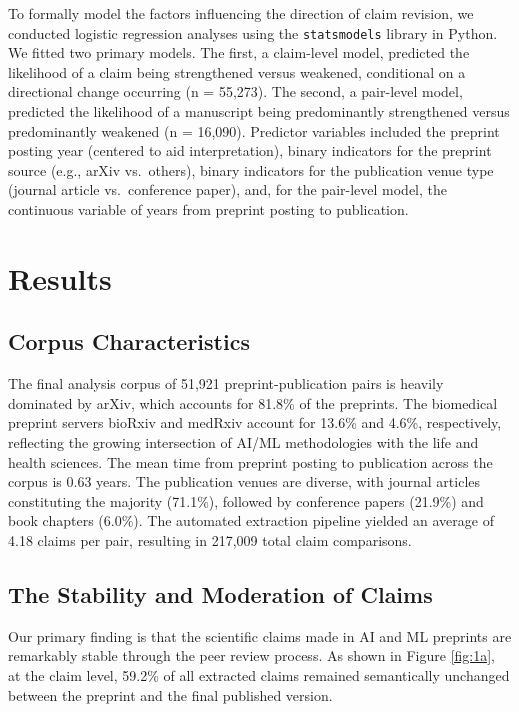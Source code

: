 \documentclass[11pt]{article}
\begin{document}
To formally model the factors influencing the direction of claim revision, we conducted logistic regression analyses using the \texttt{statsmodels} library in Python. We fitted two primary models. The first, a claim-level model, predicted the likelihood of a claim being strengthened versus weakened, conditional on a directional change occurring (n = 55,273). The second, a pair-level model, predicted the likelihood of a manuscript being predominantly strengthened versus predominantly weakened (n = 16,090). Predictor variables included the preprint posting year (centered to aid interpretation), binary indicators for the preprint source (e.g., arXiv vs.\ others), binary indicators for the publication venue type (journal article vs.\ conference paper), and, for the pair-level model, the continuous variable of years from preprint posting to publication.

\section{Results}

\subsection{Corpus Characteristics}

The final analysis corpus of 51,921 preprint-publication pairs is heavily dominated by arXiv, which accounts for 81.8\% of the preprints. The biomedical preprint servers bioRxiv and medRxiv account for 13.6\% and 4.6\%, respectively, reflecting the growing intersection of AI/ML methodologies with the life and health sciences. The mean time from preprint posting to publication across the corpus is 0.63 years. The publication venues are diverse, with journal articles constituting the majority (71.1\%), followed by conference papers (21.9\%) and book chapters (6.0\%). The automated extraction pipeline yielded an average of 4.18 claims per pair, resulting in 217,009 total claim comparisons.

\subsection{The Stability and Moderation of Claims}

Our primary finding is that the scientific claims made in AI and ML preprints are remarkably stable through the peer review process. As shown in Figure \ref{fig:1a}, at the claim level, 59.2\% of all extracted claims remained semantically unchanged between the preprint and the final published version.
\end{document}
